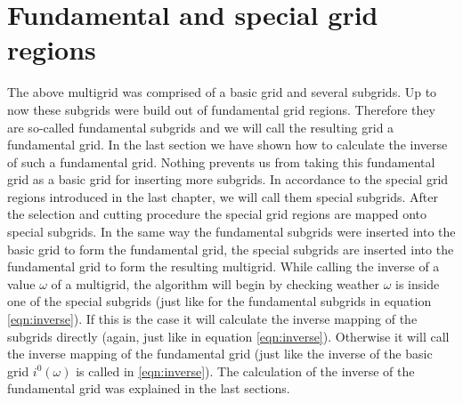 \section{Fundamental and special grid regions}\label{sec:fundamental_and_special_grid_regions_2}
The above multigrid was comprised of a basic grid and several subgrids. Up to now these subgrids were build out of fundamental grid regions. Therefore they are so-called fundamental subgrids and we will call the resulting grid a fundamental grid. In the last section we have shown how to calculate the inverse of such a fundamental grid. Nothing prevents us from taking this fundamental grid as a basic grid for inserting more subgrids. In accordance to the special grid regions introduced in the last chapter, we will call them special subgrids. After the selection and cutting procedure the special grid regions are mapped onto special subgrids. In the same way the fundamental subgrids were inserted into the basic grid to form the fundamental grid, the special subgrids are inserted into the fundamental grid to form the resulting multigrid. While calling the inverse of a value $\omega$ of a multigrid, the algorithm  will begin by checking weather $\omega$ is inside one of the special subgrids (just like for the fundamental subgrids in equation \ref{eqn:inverse}). If this is the case it will calculate the inverse mapping of the subgrids directly (again, just like in equation \ref{eqn:inverse}). Otherwise it will call the inverse mapping of the fundamental grid (just like the inverse of the basic grid $i^0(\omega)$ is called in \ref{eqn:inverse}). The calculation of the inverse of the fundamental grid was explained in the last sections.



